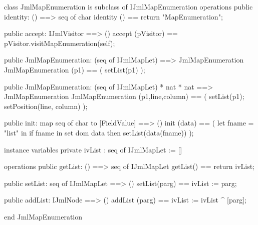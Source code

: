 \begin{vdm_al}
class JmlMapEnumeration is subclass of IJmlMapEnumeration
operations
  public identity: () ==> seq of char
  identity () == return "MapEnumeration";

  public accept: IJmlVisitor ==> ()
  accept (pVisitor) == pVisitor.visitMapEnumeration(self);

  public JmlMapEnumeration:
    (seq of IJmlMapLet) ==> JmlMapEnumeration
  JmlMapEnumeration (p1) == 
    ( setList(p1) );

  public JmlMapEnumeration:
    (seq of IJmlMapLet) *
    nat *
    nat ==> JmlMapEnumeration
  JmlMapEnumeration (p1,line,column) == 
    ( setList(p1);
      setPosition(line, column) );

  public init: map seq of char to [FieldValue] ==> ()
  init (data) ==
    ( let fname = "list" in
        if fname in set dom data
        then setList(data(fname)) );

instance variables
  private ivList : seq of IJmlMapLet := []

operations
  public getList: () ==> seq of IJmlMapLet
  getList() == return ivList;

  public setList: seq of IJmlMapLet ==> ()
  setList(parg) == ivList := parg;

  public addList: IJmlNode ==> ()
  addList (parg) == ivList := ivList ^ [parg];

end JmlMapEnumeration
\end{vdm_al}

